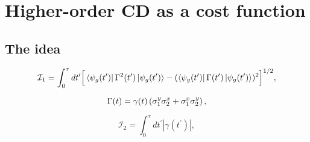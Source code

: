 \chapter{Higher-order CD as a cost function}

\section{The idea}

\begin{equation}\label{eq:AGP_integral_1}
\mathcal{I}_1 = \int_0^\tau dt^\prime \Big[\bra{\psi_g(t^\prime)} \Gamma^2(t^\prime) \ket{\psi_g(t^\prime)}  - (\bra{\psi_g(t^\prime)} \Gamma(t^\prime) \ket{\psi_g(t^\prime)})^2\Big]^{1/2},
\end{equation}

\begin{equation}\label{eq:Gamma_def}
\Gamma(t) = \gamma(t) \left( \sigma^y_1 \sigma^x_2 + \sigma^x_1 \sigma^y_2 \right),
\end{equation}

\begin{equation}\label{eq:AGP_integral_2}
\mathcal{I}_2 = \int_0^\tau dt^\prime |\gamma(t^\prime)|,
\end{equation}